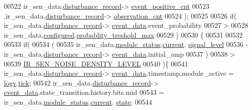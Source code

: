 \begin{DoxyCode}
00522                            ir\_sen\_data.\hyperlink{a00023_ac9b38e2c1d3f1013a88d33506c754152}{disturbance\_record}->
      \hyperlink{a00028_a7397b9d76d4b57500f27bb23d258a18a}{event\_positive\_cnt}
00523                           ,ir\_sen\_data.\hyperlink{a00023_ac9b38e2c1d3f1013a88d33506c754152}{disturbance\_record}->
      \hyperlink{a00028_ad5b0bac02ce266b91b2b52a1c3ea1d78}{observation\_cnt}
00524                            );
00525 
00526                    \textcolor{keywordflow}{if}( ir\_sen\_data.\hyperlink{a00023_ac9b38e2c1d3f1013a88d33506c754152}{disturbance\_record}->
      \hyperlink{a00028_a8c0bda69e71ef674e60da47ad0be9ab0}{event\_data}.event\_probability
00527                         >
00528                        ir\_sen\_data.\hyperlink{a00023_a94b2d1f6ea4ab334c74d24984dd27843}{configured}.\hyperlink{a00021_a7e2d217b9c9051d361319180a426851c}{probablity\_treshold\_max}
00529                      )
00530                    \{
00531 
00532                          
00533                         \textcolor{keywordflow}{if}(
00534                             (
00535                             ir\_sen\_data.\hyperlink{a00023_a5a53c391562b059eb744ac679f3765ca}{module\_status}.\hyperlink{a00017_ab8af48cdbba92b3ae39c4470e53af944}{current}.
      \hyperlink{a00017_abcdf2bc0c2e5a14863938ae28c3bc96e}{signal\_level}
00536                             - ir\_sen\_data.\hyperlink{a00023_ac9b38e2c1d3f1013a88d33506c754152}{disturbance\_record}->
      \hyperlink{a00028_a8c0bda69e71ef674e60da47ad0be9ab0}{event\_data}.initial\_amp
00537                             )
00538                             >
00539                             \hyperlink{a00017_a2b2ec7850b6e5f2ba35f81301fc797dd}{IR\_SEN\_NOISE\_DENSITY\_LEVEL}
00540                           )\{
00541                          ir\_sen\_data.\hyperlink{a00023_ac9b38e2c1d3f1013a88d33506c754152}{disturbance\_record}->
      \hyperlink{a00028_a8c0bda69e71ef674e60da47ad0be9ab0}{event\_data}.timestamp.module\_active = \hyperlink{a00021_a2e89c46668b39a17753c238950c9e1ec}{logv}.\hyperlink{a00021_a81f0ce68c2c483fb8df726cc1988d8e8}{tick};
00542                          ir\_sen\_data.\hyperlink{a00023_ac9b38e2c1d3f1013a88d33506c754152}{disturbance\_record}->
      \hyperlink{a00028_a8c0bda69e71ef674e60da47ad0be9ab0}{event\_data}.state\_transition.history.bits.mid
00543                          = ir\_sen\_data.\hyperlink{a00023_a5a53c391562b059eb744ac679f3765ca}{module\_status}.\hyperlink{a00017_ab8af48cdbba92b3ae39c4470e53af944}{current}.
      \hyperlink{a00017_a6b8d8e916bc56265a3fd279bd26b6d1b}{state};
00544 

\end{DoxyCode}
